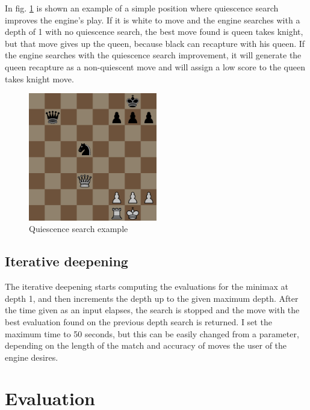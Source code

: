 
In fig. \ref{fig:quiescencePosition} is shown an example of a simple position where quiescence search improves the engine's play. If it is white to move and the engine searches with a depth of 1 with no quiescence search, the best move found is queen takes knight, but that move gives up the queen, because black can recapture with his queen. If the engine searches with the quiescence search improvement, it will generate the queen recapture as a non-quiescent move and will assign a low score to the queen takes knight move.

\begin{figure}[h]
    \centering
    \includegraphics[width=0.5\textwidth]{figures/quiescence-position.png}
    \caption{Quiescence search example}
    \label{fig:quiescencePosition}
\end{figure}

\subsection{Iterative deepening}
\label{subsec:ch4sec2subsec3}

The iterative deepening starts computing the evaluations for the minimax at depth 1, and then increments the depth up to the given maximum depth. After the time given as an input elapses, the search is stopped and the move with the best evaluation found on the previous depth search is returned. I set the maximum time to 50 seconds, but this can be easily changed from a parameter, depending on the length of the match and accuracy of moves the user of the engine desires.

\section{Evaluation}
\label{sec:ch4sec3}

